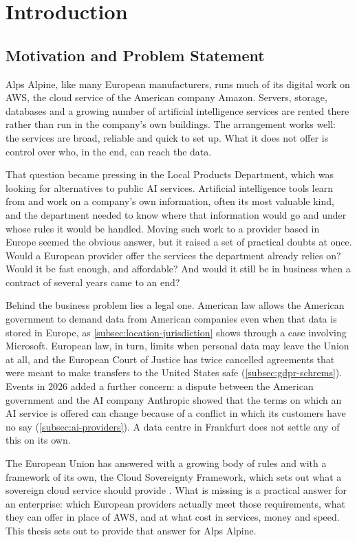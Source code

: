 \chapter{Introduction}
\label{ch:introduction}

\section{Motivation and Problem Statement}
\label{sec:motivation}

Alps Alpine, like many European manufacturers, runs much of its digital work on
\acs{AWS}, the cloud service of the American company Amazon. Servers, storage,
databases and a growing number of artificial intelligence services are rented there
rather than run in the company's own buildings. The arrangement works well: the
services are broad, reliable and quick to set up. What it does not offer is control
over who, in the end, can reach the data.

That question became pressing in the Local Products Department, which was looking
for alternatives to public \acs{AI} services. Artificial intelligence tools learn
from and work on a company's own information, often its most valuable kind, and the
department needed to know where that information would go and under whose rules it
would be handled. Moving such work to a provider based in Europe seemed the obvious
answer, but it raised a set of practical doubts at once. Would a European provider
offer the services the department already relies on? Would it be fast enough, and
affordable? And would it still be in business when a contract of several years came
to an end?

Behind the business problem lies a legal one. American law allows the American
government to demand data from American companies even when that data is stored in
Europe, as \cref{subsec:location-jurisdiction} shows through a case involving
Microsoft. European law, in turn, limits when personal data may leave the Union at
all, and the European Court of Justice has twice cancelled agreements that were meant
to make transfers to the United States safe (\cref{subsec:gdpr-schrems}). Events in
2026 added a further concern: a dispute between the American government and the
\acs{AI} company Anthropic showed that the terms on which an \acs{AI} service is
offered can change because of a conflict in which its customers have no say
(\cref{subsec:ai-providers}). A data centre in Frankfurt does not settle any of this
on its own.

The European Union has answered with a growing body of rules and with a framework of
its own, the Cloud Sovereignty Framework, which sets out what a sovereign cloud
service should provide \cite{EC_DIGIT_CloudSovereignty_2025}. What is missing is a
practical answer for an enterprise: which European providers actually meet those
requirements, what they can offer in place of \acs{AWS}, and at what cost in
services, money and speed. This thesis sets out to provide that answer for Alps
Alpine.

